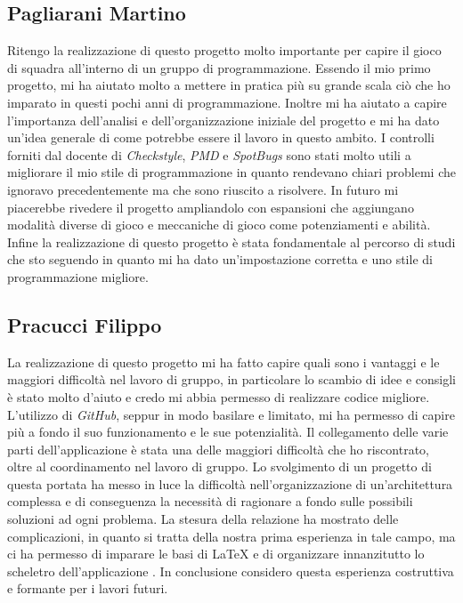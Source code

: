 \documentclass[a4paper,12pt]{report}
\begin{document}
\subsection*{Pagliarani Martino}
%
Ritengo la realizzazione di questo progetto molto importante per capire il gioco di squadra all'interno di un gruppo di programmazione. Essendo il mio primo progetto, mi ha aiutato molto a mettere in pratica pi\`u su grande scala ci\`o che ho imparato in questi pochi anni di programmazione. Inoltre mi ha aiutato a capire l'importanza dell'analisi e dell'organizzazione iniziale del progetto e mi ha dato un'idea generale di come potrebbe essere il lavoro in questo ambito. I controlli forniti dal docente di \textit{Checkstyle}, \textit{PMD} e \textit{SpotBugs} sono stati molto utili a migliorare il mio stile di programmazione in quanto rendevano chiari problemi che ignoravo precedentemente ma che sono riuscito a risolvere. In futuro mi piacerebbe rivedere il progetto ampliandolo con espansioni che aggiungano modalit\`a diverse di gioco e meccaniche di gioco come potenziamenti e abilit\`a. Infine la realizzazione di questo progetto \`e stata fondamentale al percorso di studi che sto seguendo in quanto mi ha dato un'impostazione corretta e uno stile di programmazione migliore.
%
\subsection*{Pracucci Filippo}
%
La realizzazione di questo progetto mi ha fatto capire quali sono i vantaggi e le maggiori difficolt\`a nel lavoro di gruppo, in particolare lo scambio di idee e consigli \`e stato molto d'aiuto e credo mi abbia permesso di realizzare codice migliore. L'utilizzo di \textit{GitHub}, seppur in modo basilare e limitato, mi ha permesso di capire pi\`u a fondo il suo funzionamento e le sue potenzialit\`a. Il collegamento delle varie parti dell'applicazione \`e stata una delle maggiori difficolt\`a che ho riscontrato, oltre al coordinamento nel lavoro di gruppo. Lo svolgimento di un progetto di questa portata ha messo in luce la difficolt\`a nell'organizzazione di un'architettura complessa e di conseguenza la necessit\`a di ragionare a fondo sulle possibili soluzioni ad ogni problema. La stesura della relazione ha mostrato delle complicazioni, in quanto si tratta della nostra prima esperienza in tale campo, ma ci ha permesso di imparare le basi di \LaTeX{} e di organizzare innanzitutto lo scheletro dell'applicazione . In conclusione considero questa esperienza costruttiva e formante per i lavori futuri.
%
\end{document}
